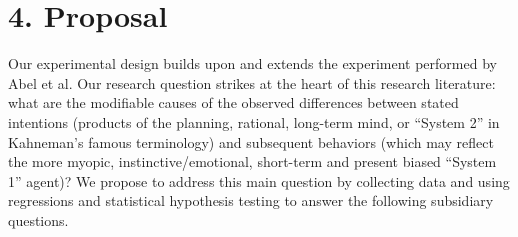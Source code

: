 \documentclass[]{elsarticle} %
\begin{document}
\section{4. Proposal}\label{proposal}

Our experimental design builds upon and extends the experiment performed
by Abel et al. Our research question strikes at the heart of this
research literature: what are the modifiable causes of the observed
differences between stated intentions (products of the planning,
rational, long-term mind, or ``System 2'' in Kahneman's famous
terminology) and subsequent behaviors (which may reflect the more
myopic, instinctive/emotional, short-term and present biased ``System
1'' agent)? We propose to address this main question by collecting data
and using regressions and statistical hypothesis testing to answer the
following subsidiary questions.
\end{document}
